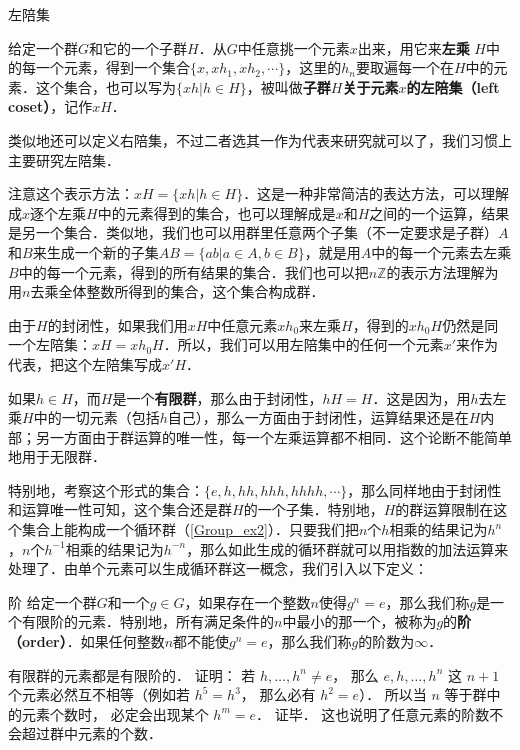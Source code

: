 \begin{definition}{左陪集}

给定一个群$G$和它的一个子群$H$．从$G$中任意挑一个元素$x$出来，用它来\textbf{左乘} $H$中的每一个元素，得到一个集合$\{x, xh_1, xh_2, \cdots\}$，这里的$h_n$要取遍每一个在$H$中的元素．这个集合，也可以写为$\{xh|h\in H\}$，被叫做\textbf{子群$H$关于元素$x$的左陪集（left coset）}，记作$xH$． 

\end{definition}

类似地还可以定义右陪集，不过二者选其一作为代表来研究就可以了，我们习惯上主要研究左陪集．

注意这个表示方法：$xH=\{xh|h\in H\}$．这是一种非常简洁的表达方法，可以理解成$x$逐个左乘$H$中的元素得到的集合，也可以理解成是$x$和$H$之间的一个运算，结果是另一个集合．类似地，我们也可以用群里任意两个子集（不一定要求是子群）$A$和$B$来生成一个新的子集$AB=\{ab|a\in A, b\in B\}$，就是用$A$中的每一个元素去左乘$B$中的每一个元素，得到的所有结果的集合．我们也可以把$n\mathbb{Z}$的表示方法理解为用$n$去乘全体整数所得到的集合，这个集合构成群．

由于$H$的封闭性，如果我们用$xH$中任意元素$xh_0$来左乘$H$，得到的$xh_0H$仍然是同一个左陪集：$xH=xh_0H$．所以，我们可以用左陪集中的任何一个元素$x'$来作为代表，把这个左陪集写成$x'H$．

如果$h\in H$，而$H$是一个\textbf{有限群}，那么由于封闭性，$hH=H$．这是因为，用$h$去左乘$H$中的一切元素（包括$h$自己），那么一方面由于封闭性，运算结果还是在$H$内部；另一方面由于群运算的唯一性，每一个左乘运算都不相同．这个论断不能简单地用于无限群．

特别地，考察这个形式的集合：$\{e, h, hh, hhh, hhhh, \cdots\}$，那么同样地由于封闭性和运算唯一性可知，这个集合还是群$H$的一个子集．特别地，$H$的群运算限制在这个集合上能构成一个循环群（\autoref{Group_ex2}）．只要我们把$n$个$h$相乘的结果记为$h^n$，$n$个$h^{-1}$相乘的结果记为$h^{-n}$，那么如此生成的循环群就可以用指数的加法运算来处理了．由单个元素可以生成循环群这一概念，我们引入以下定义：

\begin{definition}{阶}
给定一个群$G$和一个$g\in G$，如果存在一个整数$n$使得$g^n=e$，那么我们称$g$是一个有限阶的元素．特别地，所有满足条件的$n$中最小的那一个，被称为$g$的\textbf{阶（order）}．如果任何整数$n$都不能使$g^n=e$，那么我们称$g$的阶数为$\infty$．
\end{definition}

有限群的元素都是有限阶的． 证明： 若 $h, \dots, h^{n} \ne e$， 那么 $e, h, \dots, h^{n}$ 这 $n+1$ 个元素必然互不相等（例如若 $h^5 = h^3$， 那么必有 $h^2 = e$）． 所以当 $n$ 等于群中的元素个数时， 必定会出现某个 $h^m = e$． 证毕． 这也说明了任意元素的阶数不会超过群中元素的个数．

